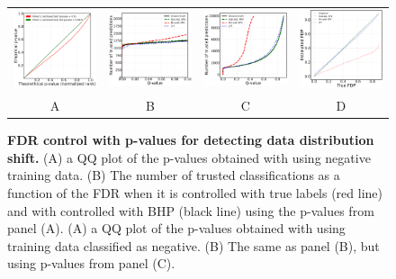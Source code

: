 \documentclass{article}
\begin{document}
\begin{figure}[hp]
	\centering
	\begin{tabular}{cccc}
		\includegraphics[width=1.7in]{img/cnn_QQ_intensity_down.png}&
		\includegraphics[width=1.7in]{img/cnn_intensity_down_fdr_control_loc.png} &
		\includegraphics[width=1.7in]
        {img/cnn_intensity_down_fdr_control.png} & 
            \includegraphics[width=1.7in]{img/cnn_FDPscat_intensity_down.png} \\		
		A & B & C & D \\
	\end{tabular}
	\caption{{\bf  FDR control with p-values for detecting data distribution shift.}
		(A) a QQ plot of the p-values obtained with using negative training data. (B) The number of trusted classifications as a function of the FDR when it is controlled with true labels (red line) and with controlled with BHP (black line) using the p-values from panel (A).
		(A) a QQ plot of the p-values obtained with using training data classified as negative. (B) The same as panel (B), but using p-values from panel (C).}
	\label{fig:mnist_shfit}
\end{figure}
\end{document}
